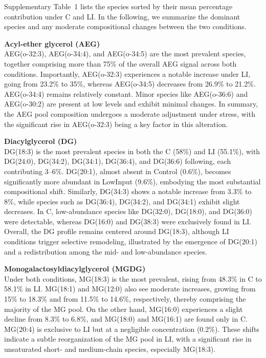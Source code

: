 \documentclass[10pt,letterpaper]{article}
\begin{document}
Supplementary Table~1 lists the species sorted by their mean percentage contribution under C and LI. In the following, we summarize the dominant species and any moderate compositional changes between the two conditions.

\bigskip
\textbf{Acyl‐ether glycerol (AEG)}  \\
AEG(o-32:3), AEG(o-34:4), and AEG(o-34:5) are the most prevalent species, together comprising more than 75\% of the overall AEG signal across both conditions. Importantly, AEG(o-32:3) experiences a notable increase under LI, going from 23.2\% to 35\%, whereas AEG(o-34:5) decreases from 26.9\% to 21.2\%. AEG(o-34:4) remains relatively constant. Minor species like AEG(o-36:6) and AEG(o-30:2) are present at low levels and exhibit minimal changes. In summary, the AEG pool composition undergoes a moderate adjustment under stress, with the significant rise in AEG(o-32:3) being a key factor in this alteration.

\textbf{Diacylglycerol (DG)}  \\
DG(18:3) is the most prevalent species in both the C (58\%) and LI (55.1\%), with DG(24:0), DG(34:2), DG(34:1), DG(36:4), and DG(36:6) following, each contributing 3–6\%. DG(20:1), almost absent in Control (0.6\%), becomes significantly more abundant in LowInput (9.6\%), embodying the most substantial compositional shift. Similarly, DG(34:3) shows a notable increase from 3.3\% to 8\%, while species such as DG(36:4), DG(34:2), and DG(34:1) exhibit slight decreases. In C, low-abundance species like DG(32:0), DG(18:0), and DG(36:0) were detectable, whereas DG(16:0) and DG(38:3) were exclusively found in LI. Overall, the DG profile remains centered around DG(18:3), although LI conditions trigger selective remodeling, illustrated by the emergence of DG(20:1) and a redistribution among the mid- and low-abundance species.


\textbf{Monogalactosyldiacylglycerol (MGDG)} \\
Under both conditions, MG(18:3) is the most prevalent, rising from 48.3\% in C to 58.1\% in LI. MG(18:1) and MG(12:0) also see moderate increases, growing from 15\% to 18.3\% and from 11.5\% to 14.6\%, respectively, thereby comprising the majority of the MG pool. On the other hand, MG(16:0) experiences a slight decline from 8.3\% to 6.8\%, and MG(18:0) and MG(16:1) are found only in C. MG(20:4) is exclusive to LI but at a negligible concentration (0.2\%). These shifts indicate a subtle reorganization of the MG pool in LI, with a significant rise in unsaturated short- and medium-chain species, especially MG(18:3).
\end{document}
